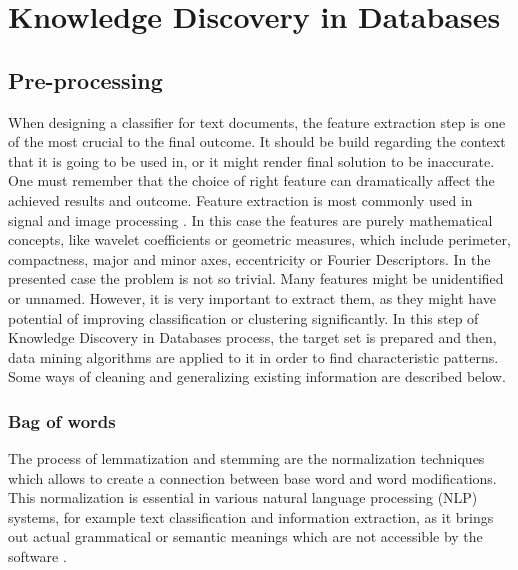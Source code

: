 \section{Knowledge Discovery in Databases}
\subsection{Pre-processing}
When designing a classifier for text documents, the feature extraction step is one of the most crucial to the final outcome. It should be build regarding the context that it is going to be used in, or it might render final solution to be inaccurate.
One must remember that the choice of right feature can dramatically affect the achieved results and outcome. Feature extraction is most commonly used in signal and image processing \cite{fe_signal_processing}. In this case the features are purely mathematical concepts, like wavelet coefficients or geometric measures, which include perimeter, compactness, major and minor axes, eccentricity or Fourier Descriptors. In the presented case the problem is not so trivial. Many features might be unidentified or unnamed. However, it is very important to extract them, as they might have potential of improving classification or clustering significantly.
In this step of Knowledge Discovery in Databases process, the target set is prepared and then, data mining algorithms are applied to it in order to find characteristic patterns.
Some ways of cleaning and generalizing existing information are described below.
	\subsubsection{Bag of words}
	The process of lemmatization and stemming are the normalization techniques which allows to create a connection between base word and word modifications. This normalization is essential in various
	natural language processing (NLP) systems, for example text classification and
	information extraction, as it brings out actual grammatical or semantic
	meanings which are not accessible by the software \cite{lemma}.

